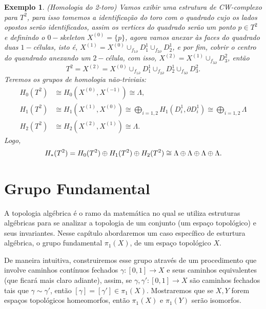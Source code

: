 \documentclass[12pt]{book}
\newtheorem{exemplo}[teorema]{Exemplo}
\newcommand{\celula}[2]{D^{#1}_{#2}}
\newcommand{\grupofundamental}[1]{\pi_{1}(#1)}
\newcommand{\homologia}[2]{H_{#1}(#2)}
\newcommand{\homologiarelcel}[3]{H_{#1}(D^{#2}_{#3}, \partial D^{#2}_{#3})}
\newcommand{\homologiarelskele}[3]{H_{#1}(X^{(#2)}, X^{(#3)})}
\newcommand{\somadir}[1]{\bigoplus \limits_{#1}}
\newcommand{\skeleton}[1]{X^{(#1)}}
\begin{document}
	\begin{exemplo}
		(Homologia do 2-toro) Vamos exibir uma estrutura de CW-complexo para $T^{2}$, para isso tomemos a identificação do toro com o quadrado cujo os lados opostos serão identificados, assim os vertices do quadrado serão um ponto $p \in T^{2}$ e definindo o $0-$skeleton $\skeleton{0} = \{p\}$, agora vamos anexar às faces do quadrado duas $1-$células, isto é, $\skeleton{1} = \skeleton{0}\cup_{f_{1\partial}}\celula{1}{1}\cup_{f_{2\partial}}\celula{1}{2}$, e por fim, cobrir o centro do quandrado anexando um $2-$célula, com isso, $\skeleton{2} = \skeleton{1}\cup_{f_{3\partial}}\celula{2}{3}$, então
		$$
		T^{2} =\skeleton{2} = \skeleton{0}\cup_{f_{1\partial}}\celula{1}{1}\cup_{f_{2\partial}}\celula{1}{2}\cup_{f_{3\partial}}\celula{2}{3}.
		$$
		Teremos os grupos de homologia não-triviais:
		$$
		\begin{aligned}
		\homologia{0}{T^{2}} &\cong \homologiarelskele{0}{0}{-1} \cong \Lambda,
		\\
		\homologia{1}{T^{2}} &\cong \homologiarelskele{1}{1}{0} \cong \somadir{i=1,2}\homologiarelcel{1}{1}{i} \cong \somadir{i=1,2}\Lambda
		\\
		\homologia{2}{T^{2}} &\cong \homologiarelskele{2}{2}{1} \cong \Lambda.
		\end{aligned}
		$$
		Logo,
		$$
		\\
		\homologia{*}{T^{2}} = \homologia{0}{T^{2}}\oplus\homologia{1}{T^{2}} \oplus\homologia{2}{T^{2}}\cong \Lambda\oplus\Lambda\oplus\Lambda\oplus\Lambda.
		$$
	\end{exemplo}	
	
	\chapter{Grupo Fundamental}
	A topologia algébrica é o ramo da matemática no qual se utiliza estruturas algébricas para se analizar a topologia de um conjunto (um espaço topológico) e seus invariantes. Nesse capítulo abordaremos um caso específico de esturtura algébrica, o grupo fundamental $\grupofundamental{X}$, de um espaço topológico $X$. 
	
	De maneira intuitiva, construiremos esse grupo através de um procedimento que involve caminhos contínuos fechados $\gamma:[0,1]\to X$ e seus caminhos equivalentes (que ficará mais claro adiante), assim, se $\gamma, \gamma':[0,1]\to X$ são caminhos fechados tais que $\gamma \sim \gamma'$, então $[\gamma] = [\gamma'] \in \grupofundamental{X}$. Mostraremos que se $X,Y$ forem espaços topológicos homeomorfos, então $\grupofundamental{X}$ e $\grupofundamental{Y}$ serão isomorfos.
	
\end{document}

